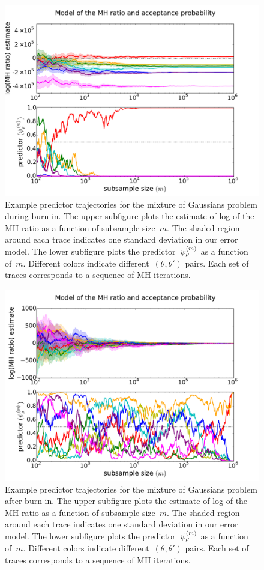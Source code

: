 \documentclass[angelino.tex]{subfiles}
\begin{document}
\newpage


\begin{figure}[h!]
\centering
\includegraphics[width=\textwidth]{figs/mix-ic-traces.pdf}
\caption{Example predictor trajectories for the mixture of Gaussians problem
during burn-in.
The upper subfigure plots the estimate of log of the MH ratio
as a function of subsample size~$m$.
The shaded region around each trace indicates one standard deviation in our error model.
The lower subfigure plots the predictor~$\psi_{\rho}^{(m)}$ as a function of~$m$.
Different colors indicate different~$(\theta, \theta')$ pairs.
Each set of traces corresponds to a sequence of MH iterations.}
\label{fig:ic}
\end{figure}

\begin{figure}[h!]
\centering
\includegraphics[width=\textwidth]{figs/mix-mle-traces.pdf}
\caption{Example predictor trajectories for the mixture of Gaussians problem
after burn-in.
The upper subfigure plots the estimate of log of the MH ratio
as a function of subsample size~$m$.
The shaded region around each trace indicates one standard deviation in our error model.
The lower subfigure plots the predictor~$\psi_{\rho}^{(m)}$ as a function of~$m$.
Different colors indicate different~$(\theta, \theta')$ pairs.
Each set of traces corresponds to a sequence of MH iterations.}
\label{fig:mle}
\end{figure}
\end{document}

